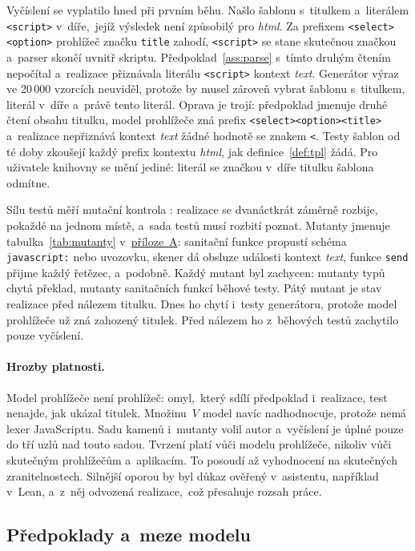 Vyčíslení se vyplatilo hned při prvním běhu. Našlo šablonu s~titulkem a~literálem \texttt{<script>} v~díře,~jejíž výsledek není způsobilý pro \emph{html}. Za prefixem \texttt{<select><option>} prohlížeč značku \texttt{title} zahodí, \texttt{<script>} se stane skutečnou značkou a~parser skončí uvnitř skriptu. Předpoklad~\ref{ass:parse} s~tímto druhým čtením nepočítal a~realizace přiznávala literálu \texttt{<script>} kontext \emph{text}. Generátor výraz ve 20\,000 vzorcích neuviděl, protože by musel zároveň vybrat šablonu s~titulkem, literál v~díře a~právě tento literál. Oprava je trojí: předpoklad jmenuje druhé čtení obsahu titulku, model prohlížeče zná prefix \texttt{<select><option><title>} a~realizace nepřiznává kontext \emph{text} žádné hodnotě se znakem \texttt{<}. Testy šablon od té doby zkoušejí každý prefix kontextu \emph{html}, jak definice~\ref{def:tpl} žádá. Pro uživatele knihovny se mění jediné: literál se značkou v~díře titulku šablona odmítne.

Sílu testů měří mutační kontrola \parencite{jia2011mutation}: realizace se dvanáctkrát záměrně rozbije, pokaždé na jednom místě, a~sada testů musí rozbití poznat. Mutanty jmenuje tabulka~\ref{tab:mutanty} v~\hyperref[app:own-work]{příloze~A}: sanitační funkce propustí schéma \texttt{javascript:} nebo uvozovku, skener dá obsluze události kontext \emph{text}, funkce \texttt{send} přijme každý řetězec, a~podobně. Každý mutant byl zachycen: mutanty typů chytá překlad, mutanty sanitačních funkcí běhové testy. Pátý mutant je stav realizace před nálezem titulku. Dnes ho chytí i~testy generátoru, protože model prohlížeče už zná zahozený titulek. Před nálezem ho z~běhových testů zachytilo pouze vyčíslení.

\paragraph{Hrozby platnosti.}
Model prohlížeče není prohlížeč: omyl,~který sdílí předpoklad i~realizace, test nenajde, jak ukázal titulek. Množinu~$V$ model navíc nadhodnocuje, protože nemá lexer JavaScriptu. Sadu kamenů i~mutanty volil autor a~vyčíslení je úplné pouze do tří uzlů nad touto sadou. Tvrzení platí vůči modelu prohlížeče, nikoliv vůči skutečným prohlížečům a~aplikacím. To posoudí až vyhodnocení na skutečných zranitelnostech. Silnější oporou by byl důkaz ověřený v~asistentu, například v~Lean, a~z~něj odvozená realizace,~což přesahuje rozsah práce.

\subsection{Předpoklady a~meze modelu}
\label{sec:model-hranice}

